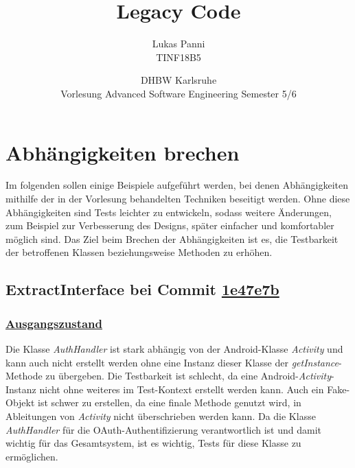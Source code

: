\documentclass[12pt]{article}
\title{Legacy Code}
\date{DHBW Karlsruhe\\ Vorlesung Advanced Software Engineering Semester 5/6}
\author{Lukas Panni \\ TINF18B5}
\begin{document}
\maketitle

\newpage

\tableofcontents

\newpage

\section{Abhängigkeiten brechen}

Im folgenden sollen einige Beispiele aufgeführt werden, bei denen Abhängigkeiten mithilfe der in der Vorlesung behandelten Techniken beseitigt werden.
Ohne diese Abhängigkeiten sind Tests leichter zu entwickeln, sodass weitere Änderungen, zum Beispiel zur Verbesserung des Designs, später einfacher und komfortabler möglich sind.
Das Ziel beim Brechen der Abhängigkeiten ist es, die Testbarkeit der betroffenen Klassen beziehungsweise Methoden zu erhöhen.

\newpage

\subsection{ExtractInterface bei Commit \href{https://github.com/lukaspanni/OpenSourceStats/commit/1e47e7b2d42c04429a433a6ac3dbea781409d36d} {1e47e7b}}

\subsubsection*{\href{https://github.com/lukaspanni/OpenSourceStats/tree/0daf8862a81a976e3d6341f5b5461bc8d3c64b4f/app/src/main/java/de/lukaspanni/opensourcestats/auth/}{Ausgangszustand}}

Die Klasse \textit{AuthHandler} ist stark abhängig von der Android-Klasse \textit{Activity} und kann auch nicht erstellt werden ohne eine Instanz dieser Klasse der \textit{getInstance}-Methode zu übergeben.
Die Testbarkeit ist schlecht, da eine Android-\textit{Activity}-Instanz nicht ohne weiteres im Test-Kontext erstellt werden kann.
Auch ein Fake-Objekt ist schwer zu erstellen, da eine finale Methode genutzt wird, in Ableitungen von \textit{Activity} nicht überschrieben werden kann.
Da die Klasse \textit{AuthHandler} für die OAuth-Authentifizierung verantwortlich ist und damit wichtig für das Gesamtsystem, ist es wichtig, Tests für diese Klasse zu ermöglichen.
\end{document}
